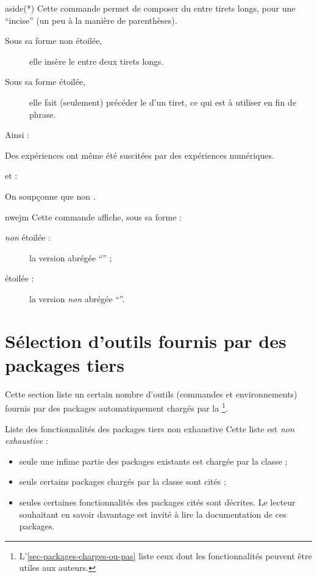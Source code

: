 \documentclass[french,nolocaltoc]{nwejmart}
\newtheorem[style=definition]{fait}
\newtheorem[title=expérience]{experience}
\newtheorem[title-plural=anneaux]{anneau}
\newtheorem[title=idéal,title-plural=idéaux]{ideal}
\begin{document}
\begin{docCommand}{aside(*)}{}
  Cette commande permet de composer du  entre tirets longs, pour une
  \enquote{incise} (un peu à la manière de parenthèses).
  \begin{description}
  \item[Sous sa forme non étoilée,] elle insère le  entre deux
    tirets longs.
  \item[Sous sa forme étoilée,] elle fait (seulement) précéder le 
    d'un tiret, ce qui est à utiliser en fin de phrase.
  \end{description}
  Ainsi :
\begin{bodycode}
Des expériences  ont même été
suscitées par des expériences numériques.
\end{bodycode}
  et :
\begin{bodycode}[listing and text,listing options={deletekeywords={exemple}}]
On soupçonne que non .
\end{bodycode}
\end{docCommand}

\begin{docCommand}{nwejm}{}
  Cette commande affiche, sous sa forme :
  \begin{description}
  \item[\emph{non} étoilée :] la version abrégée \enquote{\nwejm{}} ;
  \item[étoilée :] la version \emph{non} abrégée \enquote{\nwejm*{}}.
  \end{description}
\end{docCommand}

\section{Sélection d'outils fournis par des packages tiers}

Cette section liste un certain nombre d'outils (commandes et environnements)
fournis par des packages automatiquement chargés par la
\nwejmauthorcl\footnote{L'\vref{sec-packages-charges-ou-pas} liste ceux dont les
  fonctionnalités peuvent être utiles aux auteurs.}.

\begin{dbwarning}{Liste des fonctionnalités des packages tiers non exhaustive}{}
  Cette liste est \emph{non exhaustive} :
  \begin{itemize}
  \item seule une infime partie des packages existants est chargée par la
    classe ;
  \item seuls certains packages chargés par la classe sont cités ;
  \item seules certaines fonctionnalités des packages cités sont décrites. Le
    lecteur souhaitant en savoir davantage est invité à lire la documentation de
    ces packages.
  \end{itemize}
\end{dbwarning}
\end{document}
